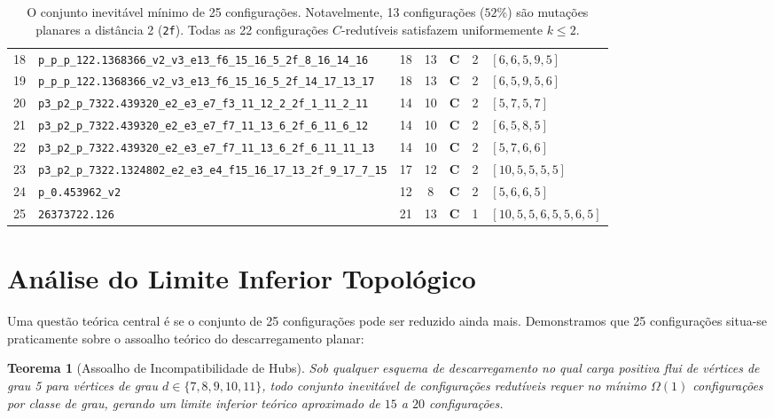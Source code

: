 \documentclass[11pt,a4paper]{article}
\theoremstyle{plain}
\newtheorem{theorem}{Teorema}[section]
\theoremstyle{definition}
\begin{document}
\begin{table}[t]
{\begin{tabular}{r l c c c c l}
18 & \texttt{p\_p\_p\_122.1368366\_v2\_v3\_e13\_f6\_15\_16\_5\_2f\_8\_16\_14\_16} & 18 & 13 & \textbf{C} & 2 & $[6, 6, 5, 9, 5]$ \\
19 & \texttt{p\_p\_p\_122.1368366\_v2\_v3\_e13\_f6\_15\_16\_5\_2f\_14\_17\_13\_17} & 18 & 13 & \textbf{C} & 2 & $[6, 5, 9, 5, 6]$ \\
20 & \texttt{p3\_p2\_p\_7322.439320\_e2\_e3\_e7\_f3\_11\_12\_2\_2f\_1\_11\_2\_11} & 14 & 10 & \textbf{C} & 2 & $[5, 7, 5, 7]$ \\
21 & \texttt{p3\_p2\_p\_7322.439320\_e2\_e3\_e7\_f7\_11\_13\_6\_2f\_6\_11\_6\_12} & 14 & 10 & \textbf{C} & 2 & $[6, 5, 8, 5]$ \\
22 & \texttt{p3\_p2\_p\_7322.439320\_e2\_e3\_e7\_f7\_11\_13\_6\_2f\_6\_11\_11\_13} & 14 & 10 & \textbf{C} & 2 & $[5, 7, 6, 6]$ \\
23 & \texttt{p3\_p2\_p\_7322.1324802\_e2\_e3\_e4\_f15\_16\_17\_13\_2f\_9\_17\_7\_15} & 17 & 12 & \textbf{C} & 2 & $[10, 5, 5, 5, 5]$ \\
24 & \texttt{p\_0.453962\_v2} & 12 & 8  & \textbf{C} & 2 & $[5, 6, 6, 5]$ \\
25 & \texttt{26373722.126} & 21 & 13 & \textbf{C} & 1 & $[10, 5, 5, 6, 5, 5, 6, 5]$ \\
\bottomrule
\end{tabular}%
}
\caption{O conjunto inevitável mínimo de 25 configurações. Notavelmente, 13 configurações ($52\%$) são mutações planares a distância 2 (\texttt{2f}). Todas as 22 configurações $C$-redutíveis satisfazem uniformemente $k \le 2$.}
\label{tab:catalog25}
\end{table}

\section{Análise do Limite Inferior Topológico}

Uma questão teórica central é se o conjunto de 25 configurações pode ser reduzido ainda mais. Demonstramos que 25 configurações situa-se praticamente sobre o assoalho teórico do descarregamento planar:

\begin{theorem}[Assoalho de Incompatibilidade de Hubs]
Sob qualquer esquema de descarregamento no qual carga positiva flui de vértices de grau 5 para vértices de grau $d \in \{7, 8, 9, 10, 11\}$, todo conjunto inevitável de configurações redutíveis requer no mínimo $\Omega(1)$ configurações por classe de grau, gerando um limite inferior teórico aproximado de $15$ a $20$ configurações.
\end{theorem}
\end{document}
